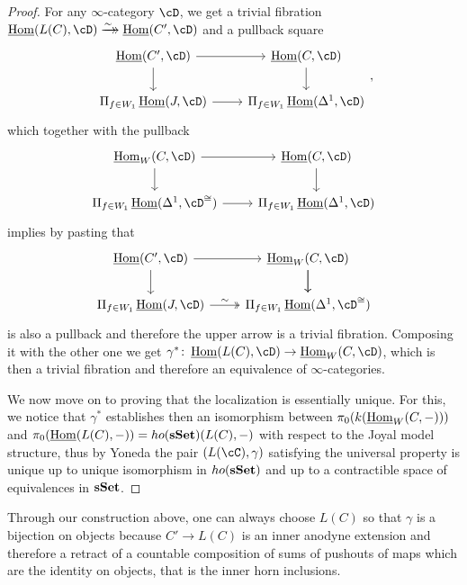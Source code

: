 \begin{proof}
  \noindent
  For any $\infty$-category $\cD$, we get a trivial fibration
  $\home(L(C),\cD)\dhxrightarrow{\sim}\home(C',\cD)$ and a pullback square
  \[\begin{tikzcd}
    {\home(C',\cD)} & {\home(C,\cD)} \\
    {\Pi_{f\in W_1}\home(J,\cD)} & {\Pi_{f\in W_1}\home(\Delta^1,\cD)}
    \arrow[from=1-2, to=2-2]
    \arrow[from=2-1, to=2-2]
    \arrow[from=1-1, to=2-1]
    \arrow[from=1-1, to=1-2]
  \end{tikzcd},\]
  which together with the pullback
  \[\begin{tikzcd}
    {\home_W(C,\cD)} & {\home(C,\cD)} \\
    {\Pi_{f\in W_1}\home(\Delta^1,\cD^{\cong})} & {\Pi_{f\in W_1}\home(\Delta^1,\cD)}
    \arrow[from=1-2, to=2-2]
    \arrow[from=2-1, to=2-2]
    \arrow[from=1-1, to=2-1]
    \arrow[from=1-1, to=1-2]
  \end{tikzcd}\]
  implies by pasting that
  \[\begin{tikzcd}
    {\home(C',\cD)} & {\home_W(C,\cD)} \\
    {\Pi_{f\in W_1}\home(J,\cD)} & {\Pi_{f\in W_1}\home(\Delta^1,\cD^{\cong})}
    \arrow[from=1-2, to=2-2]
    \arrow[from=1-1, to=1-2]
    \arrow[from=1-1, to=2-1]
    \arrow["\sim", two heads, from=2-1, to=2-2]
    \arrow[from=1-2, to=2-2]
  \end{tikzcd}\]
  is also a pullback and therefore the upper arrow is a trivial fibration.
  Composing it with the other one we get
  $\gamma^*\colon\home(L(C),\cD)\rightarrow\home_W(C,\cD)$, which is then a
  trivial fibration and therefore an equivalence of $\infty$-categories.

  We now move on to proving that the localization is essentially unique. For
  this, we notice that $\gamma^*$ establishes then an isomorphism between
  $\pi_0(k(\operatorname{\underline{Hom}}_W(C,-)))$ and $\pi_0(\operatorname{\underline{Hom}}(L(C),-))=ho(\operatorname{\mathbf{sSet}})(L(C),-)$
  with respect to the Joyal model structure, thus by Yoneda the pair
  $(L(\cC),\gamma)$ satisfying the universal property is
  unique up to unique isomorphism in $ho(\operatorname{\mathbf{sSet}})$ and up to a contractible space
  of equivalences in $\operatorname{\mathbf{sSet}}$.
\end{proof}

\begin{rmk}\label{714}
  Through our construction above, one can always choose $L(C)$ so that $\gamma$
  is a bijection on objects because $C'\rightarrow
  L(C)$ is an inner anodyne extension and therefore a retract of a countable
  composition of sums of pushouts of maps which are the identity on objects,
  that is the inner horn inclusions.
\end{rmk}

